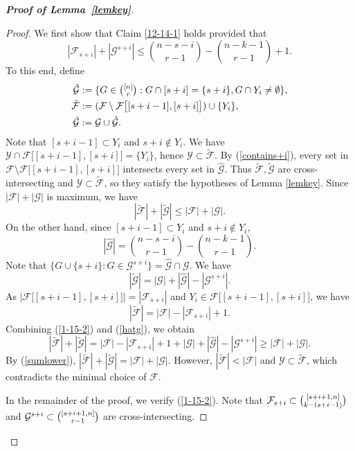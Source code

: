 \documentclass[11pt]{article}
\def\marrow{{\boldmath {\marginpar[\hfill$\rightarrow \rightarrow$]{$\leftarrow \leftarrow$}}}}
\def\andrey#1{{\sc Andrey: }{\marrow\sf \textcolor{blue}{#1}}}
\newcommand{\m}{\mathcal}
\begin{document}
\begin{proof}[{\bf Proof of Lemma~\ref{lemkey}}]
\begin{proof}
We first show that Claim \ref{12-14-1} holds provided that  
\begin{equation}\label{1-15-2}
|\mathcal{F}_{s+i}|+|\mathcal{G}^{s+i}|\le {n-s-i\choose r-1}-{n-k-1\choose r-1}+1.
\end{equation}
To this end, define 
\begin{align*}
    \hat{\m G}&:=\{G\in \tbinom{[n]}{r}: G\cap [s+i]=\{s+i\}, G\cap Y_{i}\ne \emptyset\},\\
    \tilde{\m F}&:=(\m F\setminus \m F\big[[s+i-1], [s+i]\big])\cup \{Y_{i}\},\\
    \tilde{\m G}&:=\m G\cup \hat{\m G}.
\end{align*}
Note that $[s+i-1]\subset Y_i$ and $s+i\not\in Y_i$.
We have $\m Y \cap \m F\big[[s+i-1], [s+i]\big]=\{Y_i\}$, hence $\m Y \subset \tilde{\m F}$.
By (\ref{contains+i}), every set in $\m F\setminus \m F\big[[s+i-1],[s+i]\big]$ intersects every set in $\hat{\m G}$. 
Thus $\tilde{\m F}, \tilde{\m G}$ are cross-intersecting and $\m Y \subset \tilde{\m F}$,
so they satisfy the hypotheses of  Lemma \ref{lemkey}. 
Since $|\m F|+|\m G|$ is maximum, we have 
\begin{equation}\label{sumlower}
    |\tilde{\m F}|+|\tilde{\m G}|\le |\m F|+|\m G|.
\end{equation}
On the other hand, since $[s+i-1]\subset Y_i$ and $s+i\not\in Y_i$,
\begin{equation}\label{hatg}
    |\hat{\m G}|={n-s-i\choose r-1}-{n-k-1\choose r-1}.
\end{equation}
Note that $\{G\cup \{s+i\}: G\in \m G^{s+i}\}= \hat{\m G} \cap \m G$.
We have 
$$|\tilde{\m G}|=|\m G|+|\hat{\m G}|-|\m G^{s+i}|.$$
As $|\m F\big[[s+i-1], [s+i]\big]|=|\m F_{s+i}|$ and $Y_i\in \m F\big[[s+i-1], [s+i]\big]$, we have 
$$|\tilde{\m F}|=|\m F|-|\m F_{s+i}|+1.$$
 Combining (\ref{1-15-2}) and (\ref{hatg}), we obtain 
\[
|\tilde{\m F}|+|\tilde{\m G}|=|\m F|-|\m F_{s+i}|+1+|\m G|+|\hat{\m G}|-|\m G^{s+i}|\ge |\m F|+|\m G|.
\]
By (\ref{sumlower}), $|\tilde{\m F}|+|\tilde{\m G}|=|\m F|+|\m G|$.
However, $|\tilde{\m F}|<|\m F|$ and $\m Y \subset \tilde{\m F}$, which contradicts the minimal choice of $\m F$. 

In the remainder of the proof, we verify (\ref{1-15-2}). 
Note that $\m F_{s+i}\subset\tbinom{[s+i+1,n]}{k-(s+i-1)}$ and $\m G^{s+i}\subset \tbinom{[s+i+1,n]}{r-1}$ are cross-intersecting. 


\end{proof}
\end{proof}
\end{document}
